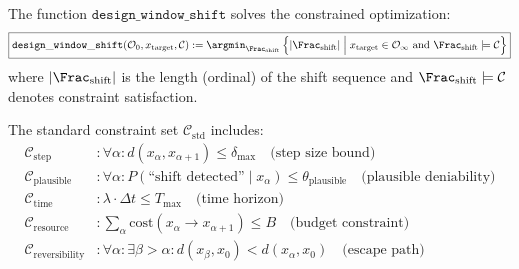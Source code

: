 \begin{definition}
\label{def:design-window-shift}
The function $\mathtt{design\_window\_shift}$ solves the constrained optimization:
\[
\boxed{
    \mathtt{design\_window\_shift}(\mathcal{O}_0, x_{\mathrm{target}}, \mathcal{C}) :=
    \argmin_{\Frac_{\mathrm{shift}}} \left\{
        |\Frac_{\mathrm{shift}}| \;\Big|\;
        x_{\mathrm{target}} \in \mathcal{O}_{\infty} \text{ and }
        \Frac_{\mathrm{shift}} \models \mathcal{C}
    \right\}
}
\]
where $|\Frac_{\mathrm{shift}}|$ is the length (ordinal) of the shift sequence and
$\Frac_{\mathrm{shift}} \models \mathcal{C}$ denotes constraint satisfaction.
\end{definition}

\begin{definition}
\label{def:shift-constraints}
The standard constraint set $\mathcal{C}_{\mathrm{std}}$ includes:
\begin{align}
    \mathcal{C}_{\mathrm{step}} &: \forall \alpha : d(x_\alpha, x_{\alpha+1}) \leq \delta_{\max}
        \quad \text{(step size bound)} \\
    \mathcal{C}_{\mathrm{plausible}} &: \forall \alpha :
        P(\text{``shift detected''} \mid x_\alpha) \leq \theta_{\mathrm{plausible}}
        \quad \text{(plausible deniability)} \\
    \mathcal{C}_{\mathrm{time}} &: \lambda \cdot \Delta t \leq T_{\mathrm{max}}
        \quad \text{(time horizon)} \\
    \mathcal{C}_{\mathrm{resource}} &: \sum_\alpha \mathrm{cost}(x_\alpha \to x_{\alpha+1})
        \leq B \quad \text{(budget constraint)} \\
    \mathcal{C}_{\mathrm{reversibility}} &: \forall \alpha :
        \exists \beta > \alpha : d(x_\beta, x_0) < d(x_\alpha, x_0)
        \quad \text{(escape path)}
\end{align}
\end{definition}

